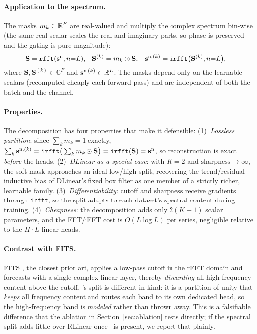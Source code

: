 \paragraph{Application to the spectrum.}
The masks $m_k \in \mathbb{R}^{F}$ are real-valued and multiply the complex spectrum
bin-wise (the same real scalar scales the real and imaginary parts, so phase is
preserved and the gating is pure magnitude):
\begin{align}
\mathbf{S} &= \texttt{rfft}(\mathbf{s}^{\mathrm{n}}, n{=}L), &
\mathbf{S}^{(k)} &= m_k \odot \mathbf{S}, &
\mathbf{s}^{\mathrm{n},(k)} &= \texttt{irfft}\big(\mathbf{S}^{(k)}, n{=}L\big),
\label{eq:band-split}
\end{align}
where $\mathbf{S}, \mathbf{S}^{(k)} \in \mathbb{C}^{F}$ and
$\mathbf{s}^{\mathrm{n},(k)} \in \mathbb{R}^{L}$. The masks depend only on the learnable scalars
(recomputed cheaply each forward pass) and are independent of both the batch and
the channel.

\paragraph{Properties.}
The decomposition has four properties that make it defensible:
(1)~\emph{Lossless partition}: since $\sum_k m_k = 1$ exactly,
$\sum_k \mathbf{s}^{\mathrm{n},(k)} = \texttt{irfft}\big(\sum_k m_k \odot \mathbf{S}\big)
= \texttt{irfft}(\mathbf{S}) = \mathbf{s}^{\mathrm{n}}$, so reconstruction is exact
\emph{before} the heads.
(2)~\emph{DLinear as a special case}: with $K{=}2$ and
$\mathrm{sharpness}\to\infty$, the soft mask approaches an ideal low/high split,
recovering the trend/residual inductive bias of DLinear's fixed box filter as one
member of a strictly richer, learnable family.
(3)~\emph{Differentiability}: $\mathrm{cutoff}$ and $\mathrm{sharpness}$ receive
gradients through \texttt{irfft}, so the split adapts to each dataset's spectral
content during training.
(4)~\emph{Cheapness}: the decomposition adds only $2(K-1)$ scalar parameters,
and the FFT/iFFT cost is $O(L\log L)$ per series, negligible relative to the
$H{\cdot}L$ linear heads.

\paragraph{Contrast with FITS.}
FITS \citep{xu2024fits}, the closest prior art, applies a low-pass cutoff in the
rFFT domain and forecasts with a single complex linear layer, thereby
\emph{discarding} all high-frequency content above the cutoff. \method's split is
different in kind: it is a partition of unity that \emph{keeps} all frequency
content and routes each band to its own dedicated head, so the high-frequency
band is \emph{modeled} rather than thrown away. This is a falsifiable difference
that the ablation in Section~\ref{sec:ablation} tests directly; if the spectral
split adds little over RLinear once \arevin\ is present, we report that plainly.

